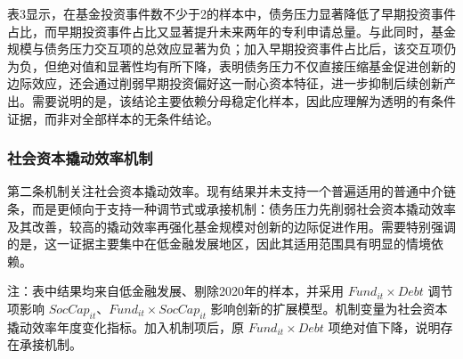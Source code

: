 表3显示，在基金投资事件数不少于2的样本中，债务压力显著降低了早期投资事件占比，而早期投资事件占比又显著提升未来两年的专利申请总量。与此同时，基金规模与债务压力交互项的总效应显著为负；加入早期投资事件占比后，该交互项仍为负，但绝对值和显著性均有所下降，表明债务压力不仅直接压缩基金促进创新的边际效应，还会通过削弱早期投资偏好这一耐心资本特征，进一步抑制后续创新产出。需要说明的是，该结论主要依赖分母稳定化样本，因此应理解为透明的有条件证据，而非对全部样本的无条件结论。

\subsubsection{社会资本撬动效率机制}

第二条机制关注社会资本撬动效率。现有结果并未支持一个普遍适用的普通中介链条，而是更倾向于支持一种调节式或承接机制：债务压力先削弱社会资本撬动效率及其改善，较高的撬动效率再强化基金规模对创新的边际促进作用。需要特别强调的是，这一证据主要集中在低金融发展地区，因此其适用范围具有明显的情境依赖。

\begin{table}[htbp]
  \centering
  \caption{社会资本撬动效率机制：最强证据}
  {\fangsong{}

  \par\smallskip
  {\songti{}注：表中结果均来自低金融发展、剔除2020年的样本，并采用 $Fund_{it}\times Debt$ 调节项影响 $SocCap_{it}$、$Fund_{it}\times SocCap_{it}$ 影响创新的扩展模型。机制变量为社会资本撬动效率年度变化指标。加入机制项后，原 $Fund_{it}\times Debt$ 项绝对值下降，说明存在承接机制。}
  }
\end{table}

